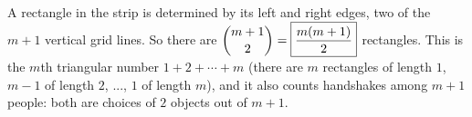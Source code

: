 A rectangle in the strip is determined by its left and right edges, two of the $m+1$ vertical grid lines. So there are $\dbinom{m+1}{2}=\boxed{\dfrac{m(m+1)}{2}}$ rectangles. This is the $m$th triangular number $1+2+\cdots+m$ (there are $m$ rectangles of length $1$, $m-1$ of length $2$, ..., $1$ of length $m$), and it also counts handshakes among $m+1$ people: both are choices of $2$ objects out of $m+1$.
